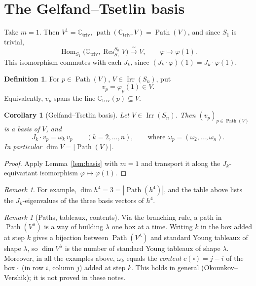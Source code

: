 \documentclass[11pt]{article}
\newtheorem{corollary}[theorem]{Corollary}
\theoremstyle{definition}
\newtheorem{definition}[theorem]{Definition}
\theoremstyle{remark}
\newtheorem{remark}[theorem]{Remark}
\newcommand{\C}{\mathbb{C}}
\DeclareMathOperator{\Irr}{Irr}
\DeclareMathOperator{\Res}{Res}
\DeclareMathOperator{\Hom}{Hom}
\DeclareMathOperator{\pth}{path}   %
\DeclareMathOperator{\Pth}{Path}   %
\newcommand{\Ctriv}{\C_{\mathrm{triv}}}
\newcommand{\h}{h}                 %
\begin{document}
\section{The Gelfand--Tsetlin basis}

Take $m=1$. Then $V^1=\Ctriv$, $\pth(\Ctriv,V)=\Pth(V)$, and since $S_1$ is
trivial,
\[
  \Hom_{S_1}\!\bigl(\Ctriv,\Res^{S_n}_{S_1}V\bigr)\xrightarrow{\ \sim\ }V,
  \qquad \varphi\longmapsto\varphi(1).
\]
This isomorphism commutes with each $J_k$, since
$(J_k\cdot\varphi)(1)=J_k\cdot\varphi(1)$.

\begin{definition}
For $p\in\Pth(V)$, $V\in\Irr(S_n)$, put
\[
  v_p=\varphi_p(1)\in V .
\]
Equivalently, $v_p$ spans the line $\Ctriv(p)\subseteq V$.
\end{definition}

\begin{corollary}[Gelfand--Tsetlin basis]\label{cor:GZ}
Let $V\in\Irr(S_n)$. Then $(v_p)_{p\in\Pth(V)}$ is a basis of $V$, and
\[
  J_k\cdot v_p=\omega_k\,v_p\qquad(k=2,\dots,n),
  \qquad\text{where }\omega_p=(\omega_2,\dots,\omega_n).
\]
In particular $\dim V=|\Pth(V)|$.
\end{corollary}

\begin{proof}
Apply Lemma~\ref{lem:basis} with $m=1$ and transport it along the
$J_k$-equivariant isomorphism $\varphi\mapsto\varphi(1)$.
\end{proof}

\begin{remark}
For example, $\dim\h^4=3=|\Pth(\h^4)|$, and the table above lists the
$J_k$-eigenvalues of the three basis vectors of $\h^4$.
\end{remark}

\begin{remark}[Paths, tableaux, contents]\label{rem:content}
Via the branching rule, a path in $\Pth(V^\lambda)$ is a way of building
$\lambda$ one box at a time. Writing $k$ in the box added at step $k$ gives a
bijection between $\Pth(V^\lambda)$ and standard Young tableaux of shape
$\lambda$, so $\dim V^\lambda$ is the number of standard Young tableaux of
shape $\lambda$. Moreover, in all the examples above, $\omega_k$ equals the
\emph{content} $c(\square)=j-i$ of the box $\square$ (in row $i$, column $j$)
added at step $k$. This holds in general (Okounkov--Vershik); it is not proved
in these notes.
\end{remark}
\end{document}
